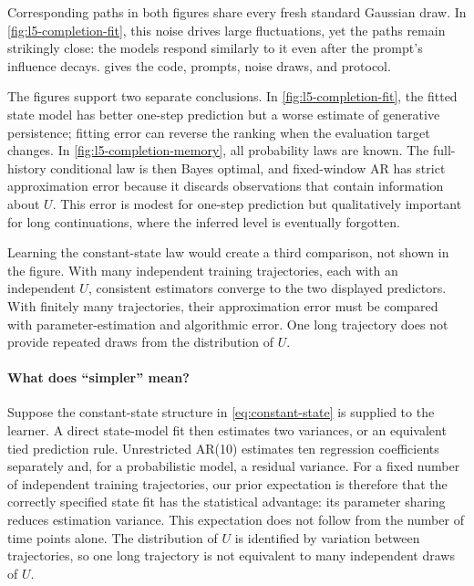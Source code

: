 \documentclass[11pt,twoside]{article}
\theoremstyle{definition}
\theoremstyle{remark}
\begin{document}


Corresponding paths in both figures share every fresh standard Gaussian
draw. In \cref{fig:l5-completion-fit}, this noise drives large fluctuations,
yet the paths remain strikingly close: the models respond similarly to it
even after the prompt's influence decays. 
gives the code, prompts, noise draws, and protocol.

The figures support two separate conclusions. In
\cref{fig:l5-completion-fit}, the fitted state model has better one-step
prediction but a worse estimate of generative persistence; fitting error can
reverse the ranking when the evaluation target changes. In
\cref{fig:l5-completion-memory}, all probability laws are known. The
full-history conditional law is then Bayes optimal, and fixed-window AR has
strict approximation error because it discards observations that contain
information about \(U\). This error is modest for one-step prediction but
qualitatively important for long continuations, where the inferred level is
eventually forgotten.

Learning the constant-state law would create a third comparison, not shown in
the figure. With many independent training trajectories, each with an
independent \(U\), consistent estimators converge to the two displayed
predictors. With finitely many trajectories, their approximation error must be
compared with parameter-estimation and algorithmic error. One long trajectory
does not provide repeated draws from the distribution of \(U\).

\clearpage
\paragraph{What does ``simpler'' mean?}
Suppose the constant-state structure in \cref{eq:constant-state} is supplied
to the learner. A direct state-model fit then estimates two variances, or an
equivalent tied prediction rule. Unrestricted AR(10) estimates ten regression
coefficients separately and, for a probabilistic model, a residual variance.
For a fixed number of independent training trajectories, our prior expectation
is therefore that the correctly specified state fit has the statistical
advantage: its parameter sharing reduces estimation variance. This expectation
does not follow from the number of time points alone. The distribution of
\(U\) is identified by variation between trajectories, so one long trajectory
is not equivalent to many independent draws of \(U\).
\end{document}
